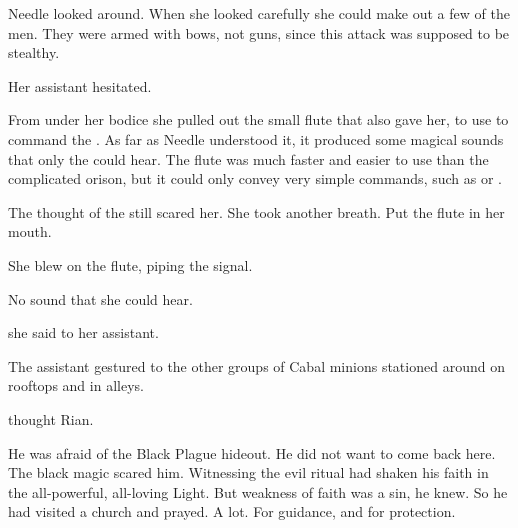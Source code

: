 Needle looked around. 
When she looked carefully she could make out a few of the men. 
They were armed with bows, not guns, since this attack was supposed to be stealthy. 

Her assistant hesitated. 


From under her bodice she pulled out the small flute that \Achsah{} also gave her, to use to command the . 
As far as Needle understood it, it produced some magical sounds that only the \grimrats{} could hear. 
The flute was much faster and easier to use than the complicated orison, but it could only convey very simple commands, such as  or . 

The thought of the \grimrats{} still scared her. 
She took another breath. 
Put the flute in her mouth. 

She blew on the flute, piping the  signal. 

No sound that she could hear.

 she said to her assistant. 

The assistant gestured to the other groups of Cabal minions stationed around on rooftops and in alleys. 


\begin{comment}
\subsection{Rian sees raid begin}
\end{comment}
\new
 thought Rian. 

He was afraid of the Black Plague hideout. 
He did not want to come back here. 
The black magic scared him. 
Witnessing the evil ritual had shaken his faith in the all-powerful, all-loving Light. 
But weakness of faith was a sin, he knew. 
So he had visited a church and prayed. 
A lot. 
For guidance, and for protection. 

